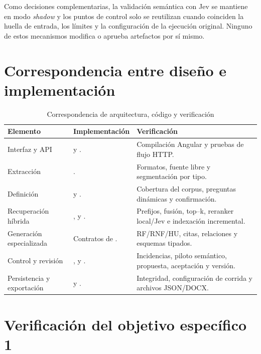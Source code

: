 Como decisiones complementarias, la validación semántica con Jev se mantiene en modo \emph{shadow} y los puntos de control solo se reutilizan cuando coinciden la huella de entrada, los límites y la configuración de la ejecución original. Ninguno de estos mecanismos modifica o aprueba artefactos por sí mismo.

\section{Correspondencia entre diseño e implementación}

\begin{table}[H]
  \centering
  \caption{Correspondencia de arquitectura, código y verificación}
  \label{tab:correspondencia-codigo}
  \small
  \begin{tabularx}{\textwidth}{p{3.5cm}p{5.1cm}Y}
    \toprule
    Elemento & Implementación & Verificación \\
    \midrule
    Interfaz y API &  y . & Compilación Angular y pruebas de flujo HTTP. \\
    Extracción & . & Formatos, fuente libre y segmentación por tipo. \\
    Definición &  y . & Cobertura del corpus, preguntas dinámicas y confirmación. \\
    Recuperación híbrida & ,  y . & Prefijos, fusión, top--k, reranker local/Jev e indexación incremental. \\
    Generación especializada & Contratos de . & RF/RNF/HU, citas, relaciones y esquemas tipados. \\
    Control y revisión & ,  y . & Incidencias, piloto semántico, propuesta, aceptación y versión. \\
    Persistencia y exportación &  y . & Integridad, configuración de corrida y archivos JSON/DOCX. \\
    \bottomrule
  \end{tabularx}
\end{table}

\section{Verificación del objetivo específico 1}

